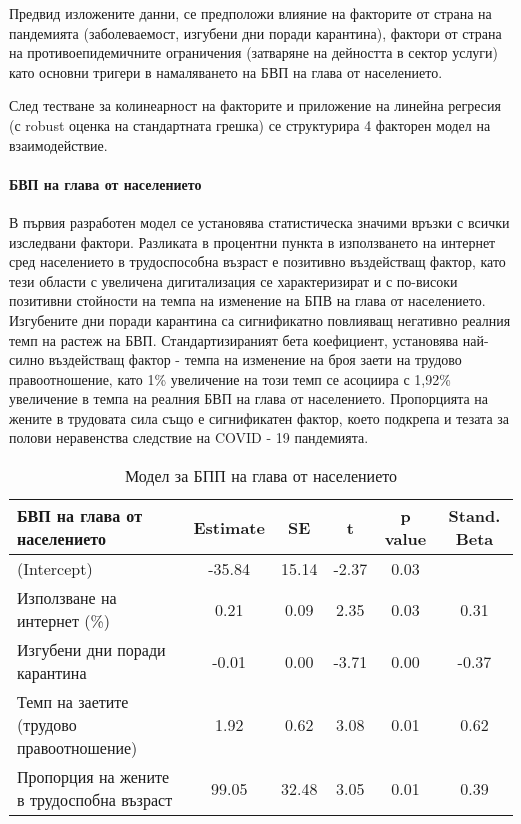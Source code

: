 \documentclass[a4paper,12pt]{article}
\begin{document}
Предвид изложените данни, се предположи влияние на факторите от страна на пандемията (заболеваемост, изгубени дни поради карантина), фактори от страна на противоепидемичните ограничения (затваряне на дейността в сектор услуги) като основни тригери в намаляването на БВП на глава от населението. 

След тестване за колинеарност на факторите и приложение на линейна регресия (с robust оценка на стандартната грешка) се структурира 4 факторен модел на взаимодействие. 

\paragraph{БВП на глава от населението}

В първия разработен модел се установява статистическа значими връзки с всички изследвани фактори. Разликата в процентни пункта в използването на интернет сред населението в трудоспособна възраст е позитивно въздействащ фактор, като тези области с увеличена дигитализация се характеризират и с по-високи позитивни стойности на темпа на изменение на БПВ на глава от населението. Изгубените дни поради карантина са сигнификатно повлияващ негативно реалния темп на растеж на БВП. Стандартизираният бета коефициент, установява най-силно въздействащ фактор - темпа на изменение на броя заети на трудово правоотношение, като 1\% увеличение на този темп се асоциира с 1,92\% увеличение в темпа на реалния БВП на глава от населението. Пропорцията на жените в трудовата сила също е сигнификатен фактор, което подкрепа и тезата за полови неравенства следствие на COVID - 19 пандемията. \cite{NBERw26947}





\begin{table}[htbp]
	\centering
	\caption{Модел за БПП на глава от населението}
	\begin{tabular}{lccccc}
		\toprule
		БВП на глава от населението  & Estimate & SE    & t     & p value & Stand. Beta \\
		\midrule
		(Intercept) & -35.84 & 15.14 & -2.37 & 0.03  &  \\
		Използване на интернет (\%) & 0.21  & 0.09  & 2.35  & 0.03  & 0.31 \\
		Изгубени дни поради карантина  & -0.01 & 0.00  & -3.71 & 0.00  & -0.37 \\
		Темп на заетите (трудово правоотношение) & 1.92  & 0.62  & 3.08  & 0.01  & 0.62 \\
		Пропорция на жените в трудоспобна възраст  & 99.05 & 32.48 & 3.05  & 0.01  & 0.39 \\
		\bottomrule
	\end{tabular}%
	\label{tab:addlabel}%
\end{table}%
\end{document}
